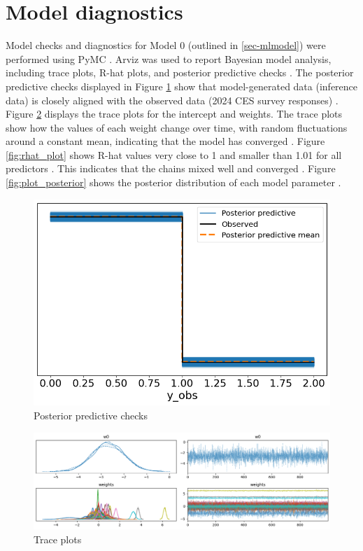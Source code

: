 \documentclass[letter]{article}
\begin{document}
\section{Model diagnostics} \label{appendix:diagnostics}
Model checks and diagnostics for Model 0 (outlined in \ref{sec-mlmodel}) were performed using PyMC \cite{pymc}. Arviz was used to report Bayesian model analysis, including trace plots, R-hat plots, and posterior predictive checks \cite{arviz} \cite{mmm}. The posterior predictive checks displayed in Figure \ref{fig:ppc} show that model-generated data (inference data) is closely aligned with the observed data (2024 CES survey responses) \cite{arviz} \cite{mmm}. Figure \ref{fig:trace_plots} displays the trace plots for the intercept and weights. The trace plots show how the values of each weight change over time, with random fluctuations around a constant mean, indicating that the model has converged \cite{mmm}. Figure \ref{fig:rhat_plot} shows R-hat values very close to 1 and smaller than 1.01 for all predictors \cite{arviz}. This indicates that the chains mixed well and converged \cite{pymc} \cite{mmm}. Figure \ref{fig:plot_posterior} shows the posterior distribution of each model parameter \cite{arviz}.
\begin{figure}[H] 
    \centering
    \includegraphics[scale=0.5]{appendix/ppcs.png}
    \caption{Posterior predictive checks}
    \label{fig:ppc}
\end{figure} 
\begin{figure}[H]
    \centering
    \includegraphics[scale=0.5]{appendix/trace_plots.png}
    \caption{Trace plots}
    \label{fig:trace_plots}
\end{figure} 
\end{document}
